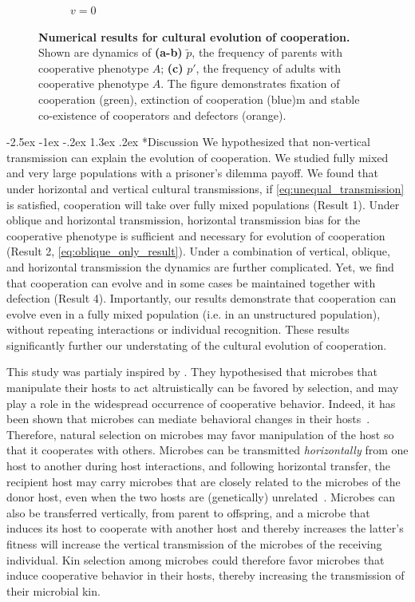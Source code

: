 \documentclass[12pt]{extarticle}
\makeatletter
\renewcommand\section{\@startsection {section}{1}{\z@}%
     {-2.5ex \@plus -1ex \@minus -.2ex}%
     {1.3ex \@plus.2ex}%
    {\Large\bfseries}}
\makeatother
\begin{document}
\begin{figure}[H]
\begin{subfigure}{8cm}
    \caption{$v=0$}
    \label{fig:results_c}
  \end{subfigure}
  \label{fig:results}
  \caption{
  \textbf{Numerical results for cultural evolution of cooperation.}
  Shown are dynamics of \textbf{(a-b)} $\tilde{p}$, the frequency of parents with cooperative phenotype $A$; \textbf{(c)} $p'$, the frequency of adults with cooperative phenotype $A$.
  The figure demonstrates fixation of cooperation (green), extinction of cooperation (blue)m and stable co-existence of cooperators and defectors (orange).
  }
\end{figure}

\section*{Discussion}
We hypothesized that non-vertical transmission can explain the evolution of cooperation.
We studied fully mixed and very large populations with a prisoner's dilemma payoff. 
We found that under horizontal and vertical cultural transmissions, if \autoref{eq:unequal_transmission} is satisfied, cooperation will take over fully mixed populations (Result 1).
Under oblique and horizontal transmission, horizontal transmission bias for the cooperative phenotype is sufficient and necessary for evolution of cooperation (Result 2, \autoref{eq:oblique_only_result}).
Under a combination of vertical, oblique, and horizontal transmission the dynamics are further complicated. Yet, we find that cooperation can evolve and in some cases be maintained together with defection (Result 4). 
Importantly, our results demonstrate that cooperation can evolve even in a fully mixed population (i.e. in an unstructured population), without repeating interactions or individual recognition.
These results significantly further our understating of the cultural evolution of cooperation. 

This study was partialy inspired by \citet{lewin2017microbes}. 
They hypothesised that microbes that manipulate their hosts to act altruistically can be favored by selection, and may play a role in the widespread occurrence of cooperative behavior. Indeed, it has been shown that microbes can mediate behavioral changes in their hosts~\citep{dobson1988population,poulin2010parasite}. Therefore, natural selection on microbes may favor manipulation of the host so that it cooperates with others. Microbes can be transmitted \emph{horizontally} from one host to another during host interactions, and following horizontal transfer, the recipient host may carry microbes that are closely related to the microbes of the donor host, even when the two hosts are (genetically) unrelated~\citep{lewin2017microbes}. Microbes can also be transferred vertically, from parent to offspring, and %
a microbe that induces its host to cooperate with another host and thereby increases the latter's fitness will  increase the vertical transmission of the microbes of the receiving individual. Kin selection among microbes could therefore favor microbes that induce cooperative behavior in their hosts, thereby increasing the transmission of their microbial kin.
\end{document}
